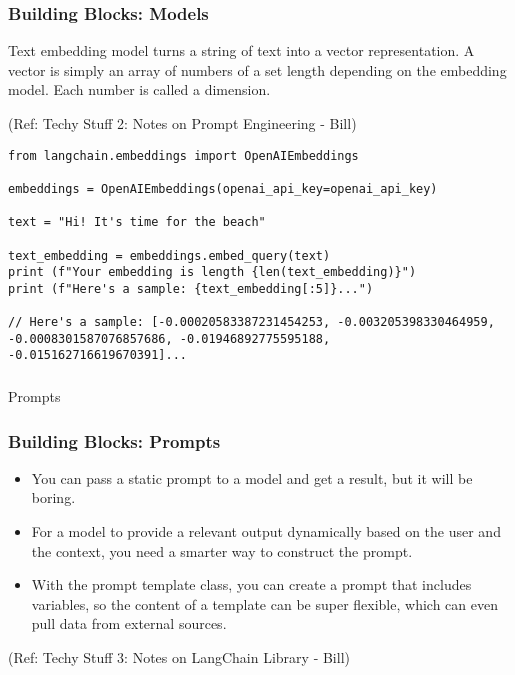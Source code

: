 \begin{frame}[fragile]\frametitle{Building Blocks: Models}

Text embedding model turns a string of text into a vector representation. A vector is simply an array of numbers of a set length depending on the embedding model. Each number is called a dimension.

{\tiny (Ref: Techy Stuff 2: Notes on Prompt Engineering - Bill)}

\begin{lstlisting}
from langchain.embeddings import OpenAIEmbeddings

embeddings = OpenAIEmbeddings(openai_api_key=openai_api_key)

text = "Hi! It's time for the beach"

text_embedding = embeddings.embed_query(text)
print (f"Your embedding is length {len(text_embedding)}")
print (f"Here's a sample: {text_embedding[:5]}...")

// Here's a sample: [-0.00020583387231454253, -0.003205398330464959, -0.0008301587076857686, -0.01946892775595188, -0.015162716619670391]...
\end{lstlisting}	  
\end{frame}

\begin{frame}[fragile]\frametitle{}
\begin{center}
{\Large Prompts}
\end{center}
\end{frame}

\begin{frame}[fragile]\frametitle{Building Blocks: Prompts}

\begin{itemize}
\item You can pass a static prompt to a model and get a result, but it will be boring. 
\item For a model to provide a relevant output dynamically based on the user and the context, you need a smarter way to construct the prompt.
\item With the prompt template class, you can create a prompt that includes variables, so the content of a template can be super flexible, which can even pull data from external sources.
\end{itemize}

{\tiny (Ref: Techy Stuff 3: Notes on LangChain Library - Bill)}

	  
\end{frame}


